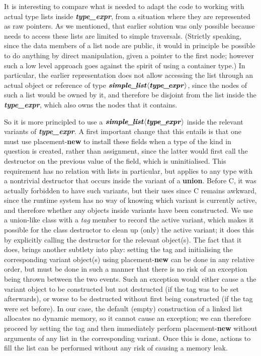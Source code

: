 \documentclass[12pt]{article}
\theoremstyle{plain}
\theoremstyle{definition}
\def\PP{\copy\PPbox}
\newcommand\Cee{\textsc{C}}
\newcommand\Cpp{\Cee\PP}
\def\smpl.{\textbf{\textit{simple\_\!list}}}
\def\tpex.{\textbf{\textit{type\_\!expr}}}
\def\ang#1{\langle#1\rangle}
\begin{document}
It is interesting to compare what is needed to adapt the code to working with
actual type lists inside \tpex., from a situation where they are represented as
raw pointers. As we mentioned, that earlier solution was only possible because
needs to access these lists are limited to simple traversals. (Strictly
speaking, since the data members of a list node are public, it would in
principle be possible to do anything by direct manipulation, given a pointer to
the first node; however such a low level approach goes against the spirit of
using a container type.) In particular, the earlier representation does not
allow accessing the list through an actual object or reference of type
$\smpl.\ang{\tpex.}$, since the nodes of such a list would be owned by it, and
therefore be disjoint from the list inside the \tpex., which also owns the nodes
that it contains.

So it is more principled to use a $\smpl.\ang{\tpex.}$ inside the relevant
variants of \tpex.. A first important change that this entails is that one must
use placement-\textbf{new} to install these fields when a type of the kind in
question is created, rather than assignment, since the latter would first call
the destructor on the previous value of the field, which is uninitialised. This
requirement has no relation with lists in particular, but applies to any type
with a nontrivial destructor that occurs inside the variant of a \textbf{union}.
Before \Cpp11, it was actually forbidden to have such variants, but their uses
since \Cpp11 remains awkward, since the runtime system has no way of knowing
which variant is currently active, and therefore whether any objects inside
variants have been constructed. We use a union-like class with a \textit{tag}
member to record the active variant, which makes it possible for the class
destructor to clean up (only) the active variant; it does this by explicitly
calling the destructor for the relevant object(s). The fact that it does, brings
another subtlety into play: setting the tag and initialising the corresponding
variant object(s) using placement-\textbf{new} can be done in any relative
order, but must be done in such a manner that there is no risk of an exception
being thrown between the two events. Such an exception would either cause a the
variant object to be constructed but not destructed (if the tag was to be set
afterwards), or worse to be destructed without first being constructed (if the
tag were set before). In our case, the default (empty) construction of a linked
list allocates no dynamic memory, so it cannot cause an exception; we can
therefore proceed by setting the tag and then immediately perform
placement-\textbf{new} without arguments of any list in the corresponding
variant. Once this is done, actions to fill the list can be performed without
any risk of causing a memory leak.
\end{document}
